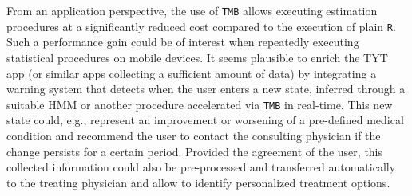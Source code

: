\documentclass[bimj,fleqn]{w-art}\usepackage[]{graphicx}\usepackage[]{color}
\theoremstyle{plain}
\theoremstyle{definition}
\begin{document}
From an application perspective, the use of {\tt{TMB}} allows executing estimation procedures at a significantly reduced cost compared to the execution of plain {\tt{R}}. Such a performance gain could be of interest when repeatedly executing statistical procedures on mobile devices. It seems plausible to enrich the TYT app (or similar apps collecting a sufficient amount of data) by integrating a warning system that detects when the user enters a new state, inferred through a suitable HMM or another procedure accelerated via {\tt{TMB}} in real-time. This new state could, e.g., represent an improvement or worsening of a pre-defined medical condition and recommend the user to contact the consulting physician if the change persists for a certain period. Provided the agreement of the user, this collected information could also be pre-processed and transferred automatically to the treating physician and allow to identify personalized treatment options.

\end{document}
